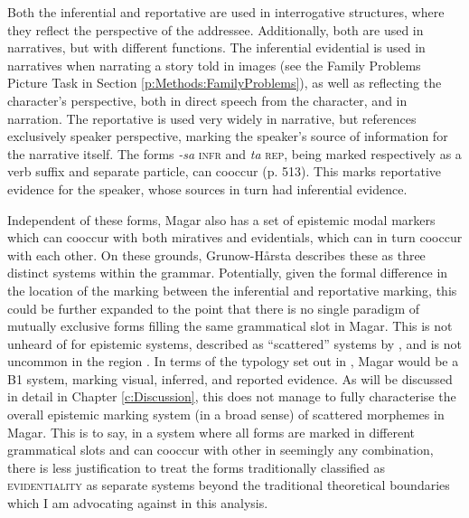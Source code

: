 Both the inferential and reportative are used in interrogative structures, where they reflect the perspective of the addressee. Additionally, both are used in narratives, but with different functions. The inferential evidential is used in narratives when narrating a story told in images (see the Family Problems Picture Task in Section \ref{p:Methods:FamilyProblems}), as well as reflecting the character's perspective, both in direct speech from the character, and in narration. The reportative is used very widely in narrative, but references exclusively speaker perspective, marking the speaker's source of information for the narrative itself. The forms \textit{-sa} \textsc{infr} and \textit{ta} \textsc{rep}, being marked respectively as a verb suffix and separate particle, can cooccur (p. 513). This marks reportative evidence for the speaker, whose sources in turn had inferential evidence.

Independent of these forms, Magar also has a set of epistemic modal markers which can cooccur with both miratives and evidentials, which can in turn cooccur with each other. On these grounds, Grunow-Hårsta describes these as three distinct systems within the grammar. Potentially, given the formal difference in the location of the marking between the inferential and reportative marking, this could be further expanded to the point that there is no single paradigm of mutually exclusive forms filling the same grammatical slot in Magar. This is not unheard of for epistemic systems, described as ``scattered'' systems by , and is not uncommon in the region \cite[480-481]{GrunowHarsta2008}. In terms of the typology set out in \cite{Aikhenvald2004}, Magar would be a B1 system, marking visual, inferred, and reported evidence. As will be discussed in detail in Chapter \ref{c:Discussion}, this does not manage to fully characterise the overall epistemic marking system (in a broad sense) of scattered morphemes in Magar. This is to say, in a system where all forms are marked in different grammatical slots and can cooccur with other in seemingly any combination, there is less justification to treat the forms traditionally classified as \textsc{evidentiality} as separate systems beyond the traditional theoretical boundaries which I am advocating against in this analysis.

